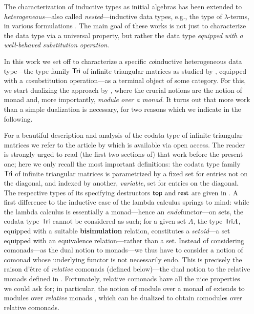 \documentclass[conference,10pt]{IEEEtran}
\newcommand{\fat}[1]{\textbf{#1}}
\begin{document}
 
 The characterization of inductive types as initial algebras 
 has been extended to \emph{heterogeneous}---also called \emph{nested}---inductive data types, e.g., the type of $\lambda$-terms,
 in various formulations \parencite{fpt, DBLP:journals/iandc/HirschowitzM10}.
 The main goal of these works is not just to characterize the data type via a universal property, but rather the data type
 \emph{equipped with a well-behaved substitution operation}.
 
 

 In this work we set off to characterize a specific \emph{co}inductive heterogeneous data type---the type family $\mathsf{Tri}$ of 
 infinite triangular matrices as studied by \textcite{DBLP:conf/types/MatthesP11}, equipped with a \emph{co}substitution operation---as a terminal object of some 
 category. For this, we start dualizing the approach by \textcite{DBLP:journals/iandc/HirschowitzM10}, where 
 the crucial notions are the notion of monad and, more importantly, \emph{module over a monad}.
 It turns out that more work than a simple dualization is necessary, for two reasons which we indicate in the following.
 
  
 For a beautiful description and analysis of the codata type of infinite triangular matrices we refer to the article by
 \textcite{DBLP:conf/types/MatthesP11} which is available via open access. The reader is strongly urged to read (the first two sections of) that work 
 before the present one; here we only recall the most important
 definitions:
 the codata type family $\mathsf{Tri}$ of infinite triangular matrices is parametrized by a fixed set for entries not on the diagonal, 
 and indexed by another, \emph{variable}, set for entries on 
 the diagonal. The respective types of its specifying destructors $\mathsf{top}$ and $\mathsf{rest}$ are given in .
 A first difference to the inductive case of the lambda calculus springs to mind:
 while the lambda calculus is essentially a monad---hence an \emph{endo}functor---on sets, the codata type $\mathsf{Tri}$ cannot be considered as such;
 for a given set $A$, the type $\mathsf{Tri} A$, equipped with a suitable \fat{bisimulation} relation, 
 constitutes a \emph{setoid}---a set equipped with an equivalence relation---rather than a set.
 Instead of considering comonads---as the dual notion to monads---we thus have to consider a notion of comonad whose underlying functor is not necessarily endo.
 This is precisely the raison d'\^etre of \emph{relative} comonads (defined below)---the dual notion to the relative monads defined in 
  \parencite{DBLP:conf/fossacs/AltenkirchCU10}. 
 Fortunately, relative comonads have all the nice properties we could ask for; 
 in particular, the notion of module over a monad of \parencite{DBLP:journals/iandc/HirschowitzM10} extends to modules over \emph{relative} monads
 \parencite{ahrens_relmonads}, which can be dualized to obtain comodules over relative comonads.
 
\end{document}
